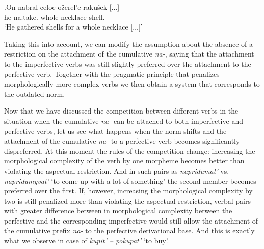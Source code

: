 \exg.\label{ex:nabrat}On nabral celoe o\v{z}erel'e raku\v{s}ek [$\ldots$]\\
he na.take. whole necklace shell.\\
\trans `He gathered shells for a whole necklace [$\ldots$]'\\

Taking this into account, we can modify the assumption about the absence of a restriction on the attachment of the cumulative \textit{na-}, saying that the attachment to the imperfective verbs was still slightly preferred over the attachment to the perfective verb. Together with the pragmatic principle that penalizes morphologically more complex verbs we then obtain a system that corresponds to the outdated norm. 

Now that we have discussed the competition between different verbs in the situation when the cumulative \textit{na-} can be attached to both imperfective and perfective verbs, let us see what happens when the norm shifts and the attachment of the cumulative \textit{na-} to a perfective verb becomes significantly dispreferred. At this moment the rules of the competition change: increasing the morphological complexity of the verb by one morpheme becomes better than violating the aspectual restriction. And in such pairs as \textit{napridumat'} vs. \textit{napridumyvat'} `to come up with a lot of something' the second member becomes preferred over the first. If, however, increasing the morphological complexity by two is still penalized more than violating the aspectual restriction, verbal pairs with greater difference between in morphological complexity between the perfective and the corresponding imperfective would still allow the attachment of the cumulative prefix \textit{na-} to the perfective derivational base. And this is exactly what we observe in case of \textit{kupit' -- pokupat'} `to buy'.

